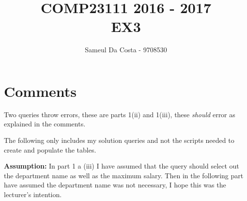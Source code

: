 \documentclass{article}
\title{COMP23111 2016 - 2017\\ EX3}
\author{Sameul Da Costa - 9708530}
\begin{document}
\maketitle
\newpage


\section{Comments}
Two queries throw errors, these are parts 1(ii) and 1(iii), these \emph{should}
error as explained in the comments.

The following only includes my solution queries and not the scripts needed to create and populate the tables.

\textbf{Assumption:} In part 1 a (iii) I have assumed that the query should select out the department name as well as the maximum salary. Then in the following part have assumed the department name was not necessary, I hope this was the lecturer's intention.
\newpage
\end{document}
